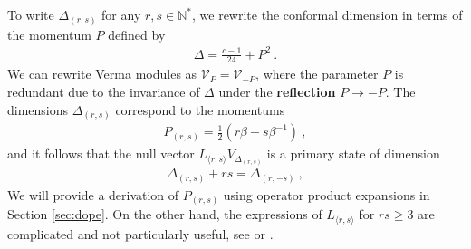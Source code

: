 \documentclass[12pt, a4paper]{article}
\newcommand{\myindex}[1]{\textbf{\boldmath #1}}
\theoremstyle{break}
\begin{document}
To write $\Delta_{(r, s)}$ for any $r,s\in\mathbb{N}^*$, we rewrite the conformal dimension in terms of the momentum $P$ defined by 
\begin{align}
 \boxed{\Delta = \frac{c-1}{24} + P^2}\ .
 \label{dp}
\end{align}
We can rewrite Verma modules as $\mathcal{V}_P=\mathcal{V}_{-P}$, where the parameter $P$ is redundant due to the invariance of $\Delta$ under the \myindex{reflection} $P\to -P$. The dimensions $\Delta_{(r, s)}$ correspond to the momentums 
\begin{align}
 \boxed{P_{(r, s)} = \frac12\left(r\beta -s\beta^{-1}\right)}\ ,
 \label{prs}
\end{align}
and it follows that the null vector $L_{\langle r,s\rangle} V_{\Delta_{(r, s)}}$ is a primary state of dimension
\begin{align}
 \Delta_{(r, s)} + rs = \Delta_{(r, -s)}\ , 
 \label{drms}
\end{align}
We will provide a derivation of $P_{(r, s)}$ using operator product expansions in Section \ref{sec:dope}. On the other hand, the expressions of $L_{\langle r,s\rangle} $ for $rs\geq 3$ are complicated and not particularly useful, see \cite{ken92} or \cite[Appendix 8A]{fms97}.
\end{document}
